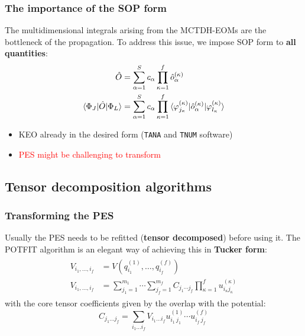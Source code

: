 \documentclass{beamer}
\begin{document}
\begin{frame}[fragile]
  \frametitle{The importance of the SOP form}
  \vspace{-.5cm}
  The multidimensional integrals arising from the MCTDH-EOMs are the bottleneck of the propagation. To address this issue, we impose SOP form to \textbf{all quantities}:
\begin{align}
\begin{split}
\hat{O} &= \sum_{\alpha=1}^S c_{\alpha} \prod_{\kappa=1}^f \hat{o}_{\alpha}^{(\kappa)} \\
\braket{\Phi_J|\hat{O}|\Phi_L} &= \sum_{\alpha=1}^S c_{\alpha} \prod_{\kappa=1}^f \braket{\varphi_{j_{\kappa}}^{(\kappa)}|\hat{o}_{\alpha}^{(\kappa)}|\varphi_{l_{\kappa}}^{(\kappa)}}
\end{split}
\end{align}
\begin{block}{}
  \begin{itemize}
  \item<1-> KEO already in the desired form (\verb|TANA| and \verb|TNUM| software)
  \item<2-> \textcolor{red}{PES might be challenging to transform}
  \end{itemize}
\end{block}
\end{frame}

\subsection{Tensor decomposition algorithms}\label{tdec}

\begin{frame}
  \frametitle{Transforming the PES}
  Usually the PES needs to be refitted (\textbf{tensor decomposed}) before using it. The POTFIT algorithm is an elegant way of achieving this in \textbf{Tucker form}:
  \begin{align}
    \label{potfit}
    \begin{split}
     V_{i_1,\ldots,i_f} &= V(q^{(1)}_{i_1},\ldots,q^{(f)}_{i_f}) \\
	V_{i_1,\ldots,i_f} &= \sum_{j_1=1}^{m_1} \cdots \sum_{j_f=1}^{m_f} C_{j_1 \cdots j_f}\prod_{\kappa=1}^f u_{i_{\kappa}j_{\kappa}}^{(\kappa)}
    \end{split}
  \end{align}
  with the core tensor coefficients given by the overlap with the potential:
\begin{equation}
  \label{core}
   C_{j_1\ldots j_f} = \sum_{i_1\ldots i_f} V_{i_1\ldots i_f} u^{(1)}_{i_1\ j_1} \cdots u^{(f)}_{i_f\ j_f}
\end{equation}
 
\end{frame}
\end{document}
